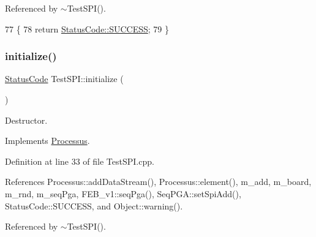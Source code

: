 Referenced by $\sim$\+Test\+S\+P\+I().


\begin{DoxyCode}
77                                \{  
78   \textcolor{keywordflow}{return} \hyperlink{classStatusCode_a6f565cbeadc76d14c72f047e5e85eb4badd0da38d3ba0d922efd1f4619bc37ad8}{StatusCode::SUCCESS};
79 \}
\end{DoxyCode}
\mbox{\label{classTestSPI_ab2c54cd233a04a583d96fde1f81d4bd6}} 
\subsubsection{\texorpdfstring{initialize()}{initialize()}}
{\footnotesize\ttfamily \hyperlink{classStatusCode}{Status\+Code} Test\+S\+P\+I\+::initialize (\begin{DoxyParamCaption}{ }\end{DoxyParamCaption})\hspace{0.3cm}{\ttfamily [virtual]}}



Destructor. 



Implements \hyperlink{classProcessus_aee88ad7b77ae7319cf8b128e9dd2ea11}{Processus}.



Definition at line 33 of file Test\+S\+P\+I.\+cpp.



References Processus\+::add\+Data\+Stream(), Processus\+::element(), m\+\_\+add, m\+\_\+board, m\+\_\+rnd, m\+\_\+seq\+Pga, F\+E\+B\+\_\+v1\+::seq\+Pga(), Seq\+P\+G\+A\+::set\+Spi\+Add(), Status\+Code\+::\+S\+U\+C\+C\+E\+SS, and Object\+::warning().



Referenced by $\sim$\+Test\+S\+P\+I().


